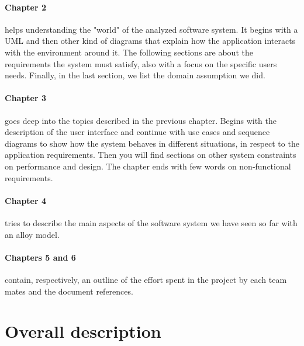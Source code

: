 \documentclass[]{article}
\begin{document}
	\paragraph{Chapter 2} helps understanding the "world" of the analyzed software system. It begins with a UML and then other kind of diagrams that explain how the application interacts with the environment around it. The following sections are about the requirements the system must satisfy, also with a focus on the specific users needs. Finally, in the last section, we list the domain assumption we did.
	
	\paragraph{Chapter 3} goes deep into the topics described in the previous chapter.
	Begins with the description of the user interface and continue with use cases and sequence diagrams to show how the system behaves in different situations, in respect to the application requirements. Then you will find sections on other system constraints on performance and design. The chapter ends with few words on non-functional requirements.
	
	\paragraph{Chapter 4} tries to describe the main aspects of the software system we have seen so far with an alloy model.
	
	\paragraph{Chapters 5 and 6} contain, respectively, an outline of the effort spent in the project by each team mates and the document references.
	
	\newpage
	\section{Overall description}
	
\end{document}
